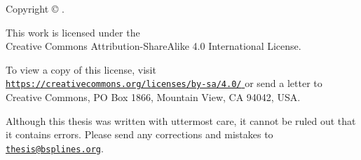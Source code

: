 {  Copyright \copyright{} \theyear{} \theauthor{}.
  
  \vspace{1em}
  
  \hangindent=29mm%
  This work is licensed under the\\
  Creative Commons Attribution-ShareAlike 4.0 International License.
  
  To view a copy of this license, visit
  \href{%
    https://creativecommons.org/licenses/by-sa/4.0/%
  }{
    \texttt{https://creativecommons.org/licenses/by-sa/4.0/}%
  }
  or send a letter to
  Creative Commons, PO Box 1866, Mountain View, CA 94042, USA.
  
  \vspace{1em}
  
  Although this thesis was written with uttermost care,
  it cannot be ruled out that it contains errors.
  Please send any corrections and mistakes to
  \href{mailto:thesis@bsplines.org}{\texttt{thesis@bsplines.org}}.
}

\cleardoublepage
